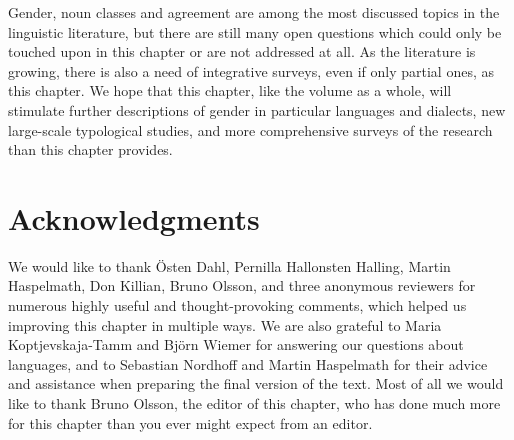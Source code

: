 \documentclass[output=collectionpaper]{langsci/langscibook}
\begin{document}
Gender, noun classes and agreement are among the most discussed topics in the linguistic literature, but there are still many open questions which could only be touched upon in this chapter or are not addressed at all. As the literature is growing, there is also a need of integrative surveys, even if only partial ones, as this chapter. We hope that this chapter, like the volume as a whole, will stimulate further descriptions of gender in particular languages and dialects, new large-scale typological studies, and more comprehensive surveys of the research than this chapter provides.

\section*{Acknowledgments}
We would like to thank Östen Dahl, Pernilla Hallonsten Halling, Martin Haspelmath, Don Killian, Bruno Olsson, and three anonymous reviewers for numerous highly useful and thought-provoking comments, which helped us improving this chapter in multiple ways. We are also grateful to Maria Koptjevskaja-Tamm and Björn Wiemer for answering our questions about  languages, and to Sebastian Nordhoff and Martin Haspelmath for their advice and assistance when preparing the final version of the text. Most of all we would like to thank Bruno Olsson, the editor of this chapter, who has done much more for this chapter than you ever might expect from an editor.
\end{document}
